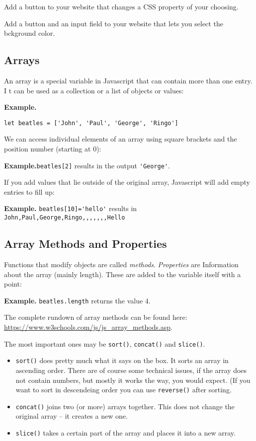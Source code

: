 \documentclass[english,11pt,a4paper]{report}
\begin{document}
\begin{ex}
Add a button to your website that changes a CSS property of your choosing.
\end{ex}

\begin{ex}
Add a button and an input field to your website that lets you select the bckground color.
\end{ex}


\newpage

\subsection{Arrays}

An array is a special variable in Javascript that can contain more than one entry. I t can be used as a collection or a list of objects or values:

{\bf Example.}
\begin{verbatim}
let beatles = ['John', 'Paul', 'George', 'Ringo']
\end{verbatim}

We can access individual elements of an array using square brackets and the position number (starting at $0$): 

{\bf Example.}\verb|beatles[2]| results in the output \verb|'George'|.

If you add values that lie outside of the original array,  Javascript will add empty entries to fill up:

{\bf Example.} \verb|beatles[10]='hello'| results in 
\verb|John,Paul,George,Ringo,,,,,,,Hello|

\subsection{Array Methods and Properties}

Functions that modify objects are called \emph{methods}.  \emph{Properties} are Information about the array (mainly length). These are added to the variable itself with a point:

{\bf Example.} \verb|beatles.length| returns the value $4$.

The complete rundown of array methods can be found here:
\url{https://www.w3schools.com/js/js_array_methods.asp}.

The most important ones may be \verb|sort()|, \verb|concat()| and \verb|slice()|. 

\begin{itemize}
\item \verb|sort()| does pretty much what it says on the box. It sorts an array in ascending order. There are of course some technical issues, if the array does not contain numbers, but mostly it works the way, you would expect. (If you want to sort in descendeing order you can use \verb|reverse()| after sorting.
\item \verb|concat()| joins two (or more) arrays together. This does not change the original array -- it creates a new one.
\item \verb|slice()| takes a certain part of the array and places it into a new array.
\end{itemize}
\end{document}
